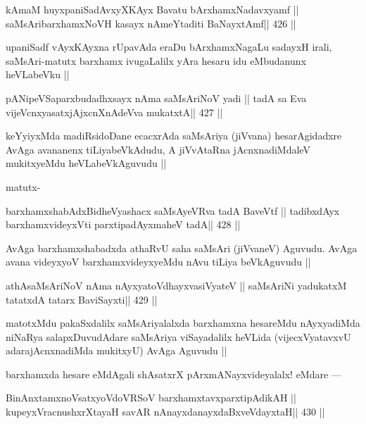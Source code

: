 \begin{shl}
kAmaM huyxpaniSadAvxyXKAyx Bavatu bArxhamxNadavxyamf ||
saMsAribarxhamxNoVH kasayx nAmeYtaditi BaNayxtAmf\hfill || 426 ||
\end{shl}

\begin{artha}
upaniSadf vAyxKAyxna rUpavAda eraDu bArxhamxNagaLu sadayxH irali,
saMsAri-matutx barxhamx ivugaLalilx yAra hesaru idu eMbudanunx
heVLabeVku ||
\end{artha}

\begin{shl}
pANipeVSaparxbudadhxsayx nAma saMsAriNoV yadi ||
tadA sa Eva vijeVcnxyasatxjAjxcnXnAdeVva mukatxtA\hfill || 427 ||
\end{shl}

\begin{artha}
keYyiyxMda madiRsidoDane ecacxrAda saMsAriya (jiVvana) hesarAgidadxre
AvAga avananenx tiLiyabeVkAdudu, A jiVvAtaRna jAcnxnadiMdaleV
mukitxyeMdu heVLabeVkAguvudu || 

matutx-
\end{artha}

\begin{shl}
barxhamxshabAdxBidheVyashacx saMsAyeVRva tadA BaveVtf ||
tadibxdAyx barxhamxvideyxVti parxtipadAyxmaheV tadA\hfill || 428 ||
\end{shl}

\begin{artha}
AvAga barxhamxshabadxda athaRvU saha saMsAri (jiVvaneV) Aguvudu. AvAga
avana videyxyoV barxhamxvideyxyeMdu nAvu tiLiya beVkAguvudu ||
\end{artha}

\begin{shl}
athAsaMsAriNoV nAma nAyxyatoV\s dhayxvasiVyateV ||
saMsAriNi yadukatxM tatatxdA tatarx BaviSayxti\hfill || 429 ||
\end{shl}

\begin{artha}
matotxMdu pakaSxdalilx saMsAriyalalxda barxhamxna hesareMdu
nAyxyadiMda niNaRya salapxDuvudAdare saMsAriya viSayadalilx heVLida
(vijecxVyatavxvU adarajAcnxnadiMda mukitxyU) AvAga Aguvudu ||
\end{artha}

\begin{artha}
barxhamxda hesare eMdAgali shAsatxrX pArxmANayxvideyalalx! eMdare ---
\end{artha}

\begin{shl}
BinAnxtamxnoVsatxyoVdoVRSoV barxhamxtavxparxtipAdikAH ||
kupeyxVracnushxrXtayaH savAR nAnayxdanayxdaBxveVdayxtaH\hfill || 430 ||
\end{shl}

